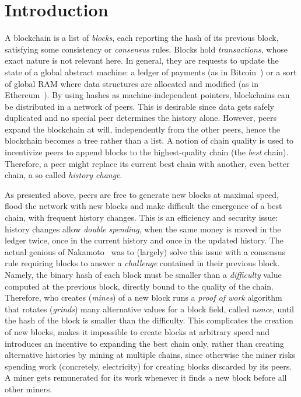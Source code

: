 \section{Introduction}\label{sec:introduction}

A blockchain is a list of \emph{blocks}, each reporting the hash
of its previous block, satisfying some consistency or \emph{consensus} rules.
Blocks hold \emph{transactions}, whose exact nature is not relevant here.
In general, they are requests to update the state of a global abstract machine:
a ledger of payments (as in Bitcoin~\cite{Nakamoto08,Antonopoulos17})
or a sort of global RAM where data structures are allocated and modified
(as in Ethereum~\cite{AntonopoulosW18}).
By using hashes as machine-independent
pointers, blockchains can be distributed in a network of peers.
This is desirable since data gets safely duplicated
and no special peer determines the history alone.
However, peers expand the blockchain at will, independently from the other
peers, hence the blockchain becomes a tree rather than a list.
A notion of chain quality is used to incentivize peers to append blocks to the highest-quality chain
(the \emph{best} chain).
Therefore, a peer might replace its current best chain with another, even better chain,
a so called \emph{history change}.

As presented above, peers are free to generate new blocks at maximal speed, flood the network
with new blocks and make difficult the emergence of a best chain, with frequent history changes.
This is an efficiency and security issue: history changes allow
\emph{double spending}, when the same money is moved in the ledger twice, once in the current history
and once in the updated history. The actual genious of Nakamoto~\cite{Nakamoto08} was to
(largely) solve this issue with a consensus rule requiring blocks to answer a \emph{challenge}
contained in their previous block. Namely, the binary hash of each block must be smaller than
a \emph{difficulty} value computed at the previous block, directly bound to the quality of the chain.
Therefore, who creates (\emph{mines}) of a new block runs a \emph{proof of work} algorithm
that rotates (\emph{grinds}) many alternative values for a block field, called \emph{nonce}, until
the hash of the block is smaller than the difficulty. This complicates the creation of new blocks,
makes it impossible to create blocks at arbitrary speed and introduces an
incentive to expanding the best chain only, rather than creating alternative histories by mining at multiple chains,
since otherwise the miner
risks spending work (concretely, electricity) for creating blocks discarded by its peers.
A miner gets remunerated for its work whenever it finds a new block before all other miners.


